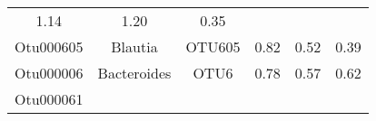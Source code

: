 \documentclass[12pt,]{article}
\begin{document}
\begin{longtable}[]{@{}cccccc@{}}
\begin{minipage}[t]{0.22\columnwidth}
1.14\strut
\end{minipage} & \begin{minipage}[t]{0.17\columnwidth}\centering\strut
1.20\strut
\end{minipage} & \begin{minipage}[t]{0.04\columnwidth}\centering\strut
0.35\strut
\end{minipage}\tabularnewline
\begin{minipage}[t]{0.08\columnwidth}\centering\strut
Otu000605\strut
\end{minipage} & \begin{minipage}[t]{0.17\columnwidth}\centering\strut
Blautia\strut
\end{minipage} & \begin{minipage}[t]{0.15\columnwidth}\centering\strut
OTU605\strut
\end{minipage} & \begin{minipage}[t]{0.22\columnwidth}\centering\strut
0.82\strut
\end{minipage} & \begin{minipage}[t]{0.17\columnwidth}\centering\strut
0.52\strut
\end{minipage} & \begin{minipage}[t]{0.04\columnwidth}\centering\strut
0.39\strut
\end{minipage}\tabularnewline
\begin{minipage}[t]{0.08\columnwidth}\centering\strut
Otu000006\strut
\end{minipage} & \begin{minipage}[t]{0.17\columnwidth}\centering\strut
Bacteroides\strut
\end{minipage} & \begin{minipage}[t]{0.15\columnwidth}\centering\strut
OTU6\strut
\end{minipage} & \begin{minipage}[t]{0.22\columnwidth}\centering\strut
0.78\strut
\end{minipage} & \begin{minipage}[t]{0.17\columnwidth}\centering\strut
0.57\strut
\end{minipage} & \begin{minipage}[t]{0.04\columnwidth}\centering\strut
0.62\strut
\end{minipage}\tabularnewline
\begin{minipage}[t]{0.08\columnwidth}\centering\strut
Otu000061\strut
\end{minipage} & \begin{minipage}[t]{0.17\columnwidth}\centering\strut

\end{minipage}
\end{longtable}
\end{document}
